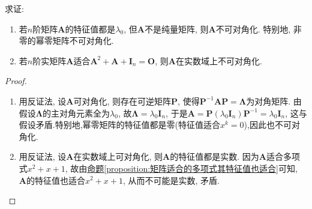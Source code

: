 \documentclass[../../main.tex]{subfiles}
\begin{document}
\begin{example}\label{example-0.10}
求证:
\begin{enumerate}[(1)]
\item 若\(n\)阶矩阵\(\boldsymbol{A}\)的特征值都是\(\lambda_0\), 但\(\boldsymbol{A}\)不是纯量矩阵, 则\(\boldsymbol{A}\)不可对角化. 特别地, 非零的幂零矩阵不可对角化.

\item 若\(n\)阶实矩阵\(\boldsymbol{A}\)适合\(\boldsymbol{A}^2 + \boldsymbol{A} + \boldsymbol{I}_n = \boldsymbol{O}\), 则\(\boldsymbol{A}\)在实数域上不可对角化.
\end{enumerate}
\end{example}
\begin{proof}
\begin{enumerate}[(1)]
\item 用反证法, 设\(\boldsymbol{A}\)可对角化, 则存在可逆矩阵\(\boldsymbol{P}\), 使得\(\boldsymbol{P}^{-1}\boldsymbol{A}\boldsymbol{P} = \boldsymbol{\Lambda}\)为对角矩阵. 由假设\(\boldsymbol{\Lambda}\)的主对角元素全为\(\lambda_0\), 故\(\boldsymbol{\Lambda} = \lambda_0\boldsymbol{I}_n\), 于是\(\boldsymbol{A} = \boldsymbol{P}(\lambda_0\boldsymbol{I}_n)\boldsymbol{P}^{-1} = \lambda_0\boldsymbol{I}_n\), 这与假设矛盾.特别地,幂零矩阵的特征值都是零(特征值适合$x^k=0$),因此也不可对角化.

\item 用反证法, 设\(\boldsymbol{A}\)在实数域上可对角化, 则\(\boldsymbol{A}\)的特征值都是实数. 因为\(\boldsymbol{A}\)适合多项式\(x^2 + x + 1\), 故由\hyperref[proposition:矩阵适合的多项式其特征值也适合]{命题\ref{proposition:矩阵适合的多项式其特征值也适合}}可知, \(\boldsymbol{A}\)的特征值也适合\(x^2 + x + 1\), 从而不可能是实数, 矛盾.
\end{enumerate}
\end{proof}
\end{document}
